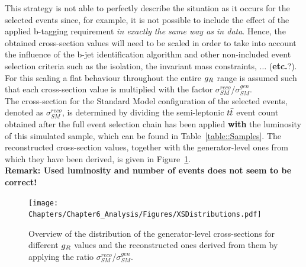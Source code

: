 This strategy is not able to perfectly describe the situation as it occurs for the selected events since, for example, it is not possible to include the effect of the applied b-tagging requirement \textit{in exactly the same way as in data}. Hence, the obtained cross-section values will need to be scaled in order to take into account the influence of the b-jet identification algorithm and other non-included event selection criteria such as the isolation, the invariant mass constraints, $\dots$ (\textbf{etc.}?).
For this scaling a flat behaviour throughout the entire $g_{R}$ range is assumed such that each cross-section value is multiplied with the factor $\sigma_{SM}^{reco}$/$\sigma_{SM}^{gen}$. 
\\
The cross-section for the Standard Model configuration of the selected events, denoted as $\sigma_{SM}^{reco}$, is determined by dividing the semi-leptonic $t\bar{t}$ event count obtained after the full event selection chain has been applied \textbf{with} the luminosity of this simulated sample, which can be found in Table~\ref{table::Samples}. The reconstructed cross-section values, together with the generator-level ones from which they have been derived, is given in Figure~\ref{fig::XSDistr}.
\\
\textbf{Remark: Used luminosity and number of events does not seem to be correct!}
\begin{figure}[h!t]
 \centering
 \texttt{[image: Chapters/Chapter6\_Analysis/Figures/XSDistributions.pdf]}
 \caption{Overview of the distribution of the generator-level cross-sections for different $g_{R}$ values and the reconstructed ones derived from them by applying the ratio $\sigma_{SM}^{reco}$/$\sigma_{SM}^{gen}$.} \label{fig::XSDistr}
\end{figure}

